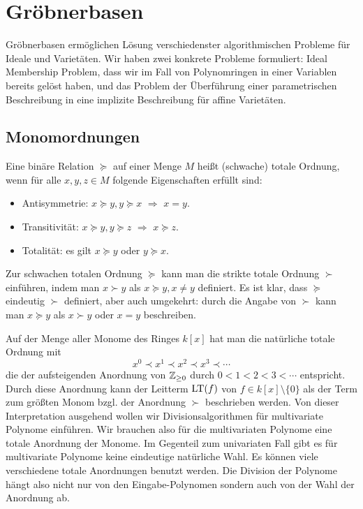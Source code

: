 \documentclass[11pt]{article}
\numberwithin{equation}{section}
\begin{document}
\section{Gröbnerbasen} 

Gröbnerbasen ermöglichen Lösung verschiedenster algorithmischen Probleme für Ideale und Varietäten. Wir haben zwei konkrete Probleme formuliert: Ideal Membership Problem, dass wir im Fall von Polynomringen in einer Variablen bereits gelöst haben, und das Problem der Überführung einer parametrischen Beschreibung in eine implizite Beschreibung für affine Varietäten. 



\subsection{Monomordnungen} 

\begin{definition} 
Eine binäre Relation $\succeq$ auf einer Menge $M$ heißt (schwache) totale Ordnung, wenn für alle $x,y,z \in M$ folgende Eigenschaften erfüllt sind: 
\begin{itemize} 
	\item[] Antisymmetrie: $x \succeq y, y \succeq x$ $\Rightarrow$ $x=y$. 
	\item[] Transitivität: $x \succeq y, y \succeq z$ $\Rightarrow$ $x \succeq z$. 
	\item[] Totalität: es gilt $x \succeq y$ oder $y \succeq x$. 
\end{itemize} 
Zur schwachen totalen Ordnung $\succeq$ kann man die strikte totale Ordnung $ \succ $ einführen, indem man $x \succ y$ als $ x \succeq y, x \ne y$ definiert. Es ist klar, dass $\succeq$ eindeutig $\succ$ definiert, aber auch umgekehrt: durch die Angabe von $\succ$ kann man $x \succeq y $  als $x \succ y$ oder $x=y$ beschreiben. 
\end{definition} 

Auf der Menge aller Monome des Ringes $k[x]$ hat man  die natürliche totale Ordnung mit
\[
	x^0 \prec x^1 \prec x^2 \prec x^3 \prec \cdots 
\]
die der aufsteigenden Anordnung von $\mathbb{Z}_{\ge 0}$ durch $0 < 1 < 2 < 3 < \cdots$ entspricht. Durch diese Anordnung kann der Leitterm $\operatorname{LT}(f)$ von $f \in k[x] \setminus \{0\}$ als der Term zum größten Monom bzgl. der Anordnung $\succ$ beschrieben werden. Von dieser Interpretation ausgehend wollen wir Divisionsalgorithmen für multivariate Polynome einführen. Wir brauchen also für die multivariaten Polynome eine totale Anordnung der Monome. Im Gegenteil zum univariaten Fall gibt es für multivariate Polynome keine eindeutige natürliche Wahl. Es können viele verschiedene totale Anordnungen benutzt werden. Die Division der Polynome hängt also nicht nur von den Eingabe-Polynomen sondern auch von der Wahl der Anordnung ab. 
\end{document}
